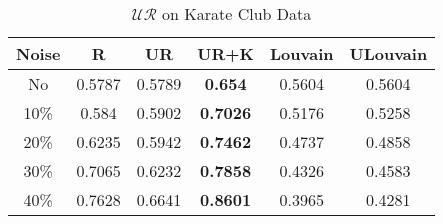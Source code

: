 \documentclass[\main/thesis.tex]{subfiles}
\begin{document}

\begin{table}[]
\centering
\caption{$\mathcal{UR}$ on Karate Club Data}
\label{unsupervised_karate}
\begin{tabular}{|c|c|c|c|c|c|}
\hline
Noise & R      & UR     & UR+K            & Louvain & ULouvain \\ \hline
No    & 0.5787 & 0.5789 & \textbf{0.654}  & 0.5604  & 0.5604   \\ \hline
10\%  & 0.584  & 0.5902 & \textbf{0.7026} & 0.5176  & 0.5258   \\ \hline
20\%  & 0.6235 & 0.5942 & \textbf{0.7462} & 0.4737  & 0.4858   \\ \hline
30\%  & 0.7065 & 0.6232 & \textbf{0.7858} & 0.4326  & 0.4583   \\ \hline
40\%  & 0.7628 & 0.6641 & \textbf{0.8601} & 0.3965  & 0.4281   \\ \hline
\end{tabular}
\end{table}
\end{document}

